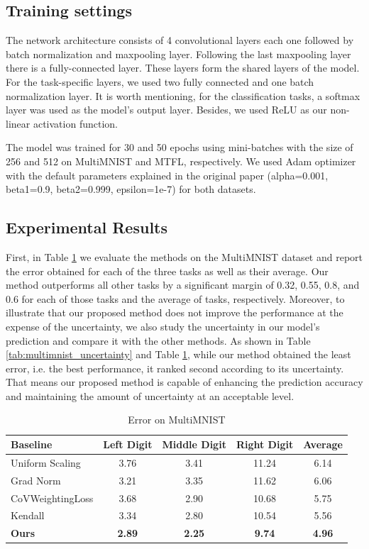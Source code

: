 \documentclass[12pt,a4paper]{article}
\begin{document}
	\subsection{Training settings}
	
	The network architecture consists of 4 convolutional layers each one followed by batch normalization and maxpooling layer. Following the last maxpooling layer there is a fully-connected layer. These layers form the shared layers of the model. For the task-specific layers, we used two fully connected and one batch normalization layer. It is worth mentioning, for the classification tasks, a softmax layer was used as the model's output layer. Besides, we used ReLU as our non-linear activation function.
	
	The model was trained for 30 and 50 epochs using mini-batches with the size of 256 and 512 on MultiMNIST and MTFL, respectively. We used Adam optimizer \cite{kingma2014adam} with the default parameters explained in the original paper (alpha=0.001, beta1=0.9, beta2=0.999, epsilon=1e-7) for both datasets.
	
	\subsection{Experimental Results}
	
	First, in Table \ref{tab:multimnist_error} we evaluate the methods on the MultiMNIST dataset and report the error obtained for each of the three tasks as well as their average. Our method outperforms all other tasks by a significant margin of 0.32, 0.55, 0.8, and 0.6 for each of those tasks and the average of tasks, respectively. Moreover, to illustrate that our proposed method does not improve the performance at the expense of the uncertainty, we also study the uncertainty in our model's prediction and compare it with the other methods. As shown in Table \ref{tab:multimnist_uncertainty} and Table \ref{tab:multimnist_error}, while our method obtained the least error, i.e. the best performance, it ranked second according to its uncertainty. That means our proposed method is capable of enhancing the prediction accuracy and maintaining the amount of uncertainty at an acceptable level.
	
	\begin{table}[htbp]
		\centering
		\caption{Error on MultiMNIST}
		\label{tab:multimnist_error}
		\begin{tabular}{lcccc}
			\toprule
			Baseline & Left Digit & Middle Digit & Right Digit & Average \\
			\midrule
			Uniform Scaling & 3.76 & 3.41 & 11.24 & 6.14 \\
			Grad Norm & 3.21 & 3.35 & 11.62 & 6.06 \\
			CoVWeightingLoss & 3.68 & 2.90 & 10.68 & 5.75 \\
			Kendall & 3.34 & 2.80 & 10.54 & 5.56 \\
			\textbf{Ours} & \textbf{2.89} & \textbf{2.25} & \textbf{9.74} & \textbf{4.96} \\
			\bottomrule
		\end{tabular}
	\end{table}
	
\end{document}
